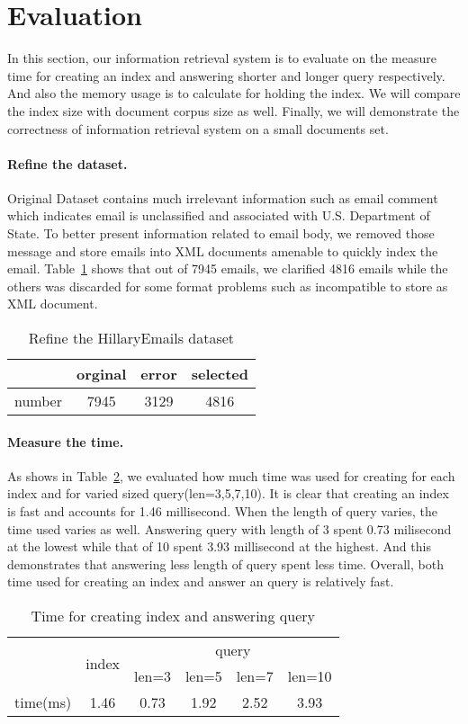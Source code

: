 \section{Evaluation}
In this section, our information retrieval system is to evaluate on the measure time for creating an index and answering shorter and longer query respectively. And also the memory usage is to calculate for holding the index. We will compare the index size with document corpus size as well. Finally, we will demonstrate the correctness of information retrieval system on a small documents set.
\paragraph{Refine the dataset.} Original Dataset contains much irrelevant information such as email comment which indicates email is unclassified and  associated with U.S. Department of State. To better present information related to email body, we removed those message and store 
emails into XML documents amenable to quickly index the email. Table~\ref{tab:refine} shows that out of 7945 emails, we clarified 4816 emails while the others was discarded for some format problems such as incompatible to store as XML document.
\begin{table}[!ht]
	\centering
	\begin{tabular}{c|ccc}
		\toprule
		 & orginal & error & selected \\
		\midrule
		 number & 7945  & 3129 & 4816	\\
		\bottomrule
	\end{tabular}
	\caption{Refine the HillaryEmails dataset}
	\label{tab:refine}
\end{table}
\paragraph{Measure the time.}  As shows in Table~\ref{tab:time}, we evaluated how much time was used for creating for each index and for varied sized query(len=3,5,7,10). It is clear that creating an index is fast and accounts for 1.46 millisecond. When the length of query varies, the time used varies as well. Answering query with length of 3 spent 0.73 milisecond at the lowest while that of 10 spent 3.93 millisecond at the highest. And this demonstrates that answering less length of query spent less time. Overall, both time used for creating an index and answer an query is relatively fast.
\begin{table}[!ht]
	\centering
	\begin{tabular}{c|c|cccc}
		\toprule
		&\multirow{2}{*}{index} &  \multicolumn{4}{c}{query} \\
		\cline{3-6}
		         &    &len=3 & len=5 & len=7 & len=10 \\
		\midrule
	    time(ms)&  1.46 & 0.73  & 1.92  & 2.52  & 3.93	\\
		\bottomrule
	\end{tabular}
	\caption{Time for creating index and answering query}
	\label{tab:time}
\end{table}

